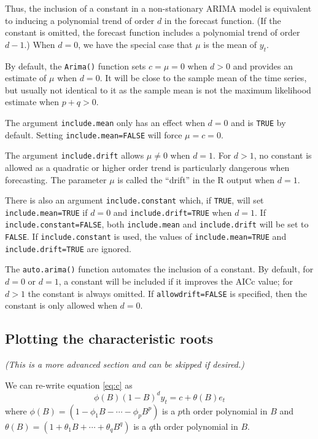 \documentclass[]{book}
\begin{document}
Thus, the inclusion of a constant in a non-stationary ARIMA model is equivalent to inducing a polynomial trend of order \(d\) in the forecast function. (If the constant is omitted, the forecast function includes a polynomial trend of order \(d-1\).) When \(d=0\), we have the special case that \(\mu\) is the mean of \(y_t\).

By default, the \texttt{Arima()} function sets \(c=\mu=0\) when \(d>0\) and provides an estimate of \(\mu\) when \(d=0\). It will be close to the sample mean of the time series, but usually not identical to it as the sample mean is not the maximum likelihood estimate when \(p+q>0\).

The argument \texttt{include.mean} only has an effect when \(d=0\) and is \texttt{TRUE} by default. Setting \texttt{include.mean=FALSE} will force \(\mu=c=0\).

The argument \texttt{include.drift} allows \(\mu\ne0\) when \(d=1\). For \(d>1\), no constant is allowed as a quadratic or higher order trend is particularly dangerous when forecasting. The parameter \(\mu\) is called the ``drift'' in the R output when \(d=1\).

There is also an argument \texttt{include.constant} which, if \texttt{TRUE}, will set \texttt{include.mean=TRUE} if \(d=0\) and \texttt{include.drift=TRUE} when \(d=1\). If \texttt{include.constant=FALSE}, both \texttt{include.mean} and \texttt{include.drift} will be set to \texttt{FALSE}. If \texttt{include.constant} is used, the values of \texttt{include.mean=TRUE} and \texttt{include.drift=TRUE} are ignored.

The \texttt{auto.arima()} function automates the inclusion of a constant. By default, for \(d=0\) or \(d=1\), a constant will be included if it improves the AICc value; for \(d>1\) the constant is always omitted. If \texttt{allowdrift=FALSE} is specified, then the constant is only allowed when \(d=0\).

\hypertarget{plotting-the-characteristic-roots}{%
\subsection*{Plotting the characteristic roots}\label{plotting-the-characteristic-roots}}

\emph{(This is a more advanced section and can be skipped if desired.)}

We can re-write equation \eqref{eq:c} as
\[\phi(B) (1-B)^d y_t = c + \theta(B) e_t\]
where \(\phi(B)= (1-\phi_1B - \cdots - \phi_p B^p)\) is a \(p\)th order polynomial in \(B\) and \(\theta(B) = (1 + \theta_1 B + \cdots + \theta_q B^q)\) is a \(q\)th order polynomial in \(B\).
\end{document}
